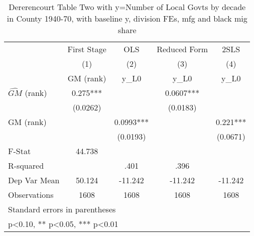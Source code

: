 \begin{table}[htbp]\centering
\def\sym#1{\ifmmode^{#1}\else\(^{#1}\)\fi}
\caption{Dererencourt Table Two with y=Number of Local Govts by decade in County 1940-70, with baseline y, division FEs, mfg and black mig share}
\begin{tabular}{l*{4}{c}}
\toprule
                    & First Stage   &         OLS   &Reduced Form   &        2SLS   \\
                    &\multicolumn{1}{c}{(1)}&\multicolumn{1}{c}{(2)}&\multicolumn{1}{c}{(3)}&\multicolumn{1}{c}{(4)}\\
                    &\multicolumn{1}{c}{GM  (rank)}&\multicolumn{1}{c}{y\_L0}&\multicolumn{1}{c}{y\_L0}&\multicolumn{1}{c}{y\_L0}\\
\midrule
$\hat{GM}$ (rank)   &       0.275***&               &      0.0607***&               \\
                    &    (0.0262)   &               &    (0.0183)   &               \\
\addlinespace
GM  (rank)          &               &      0.0993***&               &       0.221***\\
                    &               &    (0.0193)   &               &    (0.0671)   \\
\midrule
F-Stat              &      44.738   &               &               &               \\
R-squared           &               &        .401   &        .396   &               \\
Dep Var Mean        &      50.124   &     -11.242   &     -11.242   &     -11.242   \\
Observations        &        1608   &        1608   &        1608   &        1608   \\
\bottomrule
\multicolumn{5}{l}{\footnotesize Standard errors in parentheses}\\
\multicolumn{5}{l}{\footnotesize * p<0.10, ** p<0.05, *** p<0.01}\\
\end{tabular}
\end{table}
